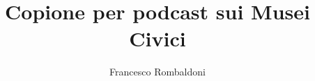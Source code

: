 \documentclass[hidelinks,12pt,a4paper]{article}
\begin{document}
	\begin{flushleft}
		
		\title{\textbf{Copione per podcast sui Musei Civici}}
		\author{Francesco Rombaldoni}
		\date{}
		
		\maketitle
		
		\setcounter{page}{1}
		\newpage
		
		\tableofcontents
		\newpage
		
		
		
		\vspace*{\fill}
		\doclicenseThis
	\end{flushleft}
\end{document}
